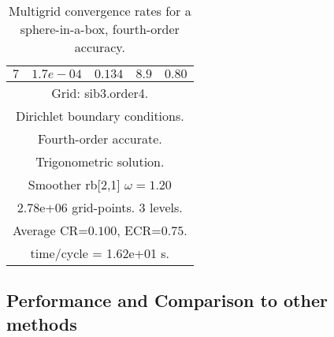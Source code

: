 \documentclass[12pt]{article}
\begin{document}
\begin{table}[hbt]
\begin{center}
{\begin{tabular}{|c|c|c|c|c|}
 $ 7$  & $ 1.7e-04$ & $0.134$ & $ 8.9$ & $0.80$ \\ 
\hline 
\multicolumn{5}{|c|}{Grid: sib3.order4.}  \\
\multicolumn{5}{|c|}{Dirichlet boundary conditions.}  \\
\multicolumn{5}{|c|}{Fourth-order accurate.}  \\
\multicolumn{5}{|c|}{Trigonometric solution.}  \\
\multicolumn{5}{|c|}{Smoother rb[2,1] $\omega=1.20$}  \\
\multicolumn{5}{|c|}{2.78e+06 grid-points. 3 levels.}  \\
\multicolumn{5}{|c|}{Average CR=$0.100$, ECR=$0.75$.}  \\
\multicolumn{5}{|c|}{time/cycle = 1.62e+01 s.}  \\
\hline 
\end{tabular}
} %
\end{center}
\caption{Multigrid convergence rates for a sphere-in-a-box, fourth-order accuracy.}
\label{fig:sibII}
\end{table}


\clearpage
\subsection{Performance and Comparison to other methods}











\printindex
\end{document}

